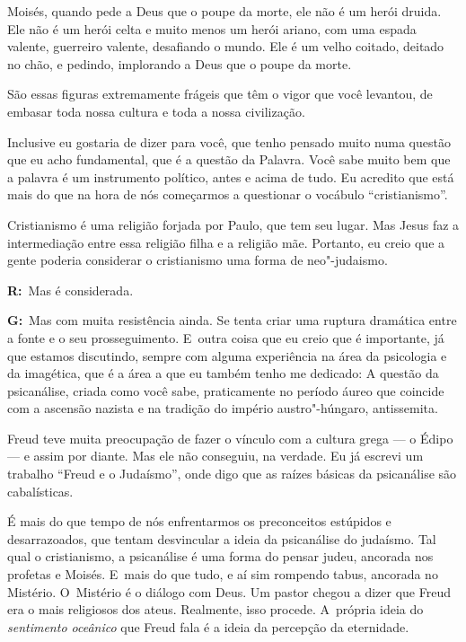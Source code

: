  

Moisés, quando pede a Deus que o poupe da morte, ele não é um herói
druida. Ele não é um herói celta e muito menos um herói ariano, com uma
espada valente, guerreiro valente, desafiando o mundo. Ele é um velho
coitado, deitado no chão, e pedindo, implorando a Deus que o poupe da
morte.

 

São essas figuras extremamente frágeis que têm o vigor que você
levantou, de embasar toda nossa cultura e toda a nossa civilização.

 

Inclusive eu gostaria de dizer para você, que tenho pensado muito numa
questão que eu acho fundamental, que é a questão da Palavra. Você sabe
muito bem que a palavra é um instrumento político, antes e acima de
tudo. Eu acredito que está mais do que na hora de nós começarmos a
questionar o vocábulo ``cristianismo''.

 

Cristianismo é uma religião forjada por Paulo, que tem seu lugar. Mas
Jesus faz a intermediação entre essa religião filha e a religião mãe.
Portanto, eu creio que a gente poderia considerar o cristianismo uma
forma de neo"-judaismo.

 

\textbf{R:}~Mas é considerada.

 

\textbf{G:}~Mas com muita resistência ainda. Se tenta criar uma ruptura
dramática entre a fonte e o seu prosseguimento. E~outra coisa que eu
creio que é importante, já que estamos discutindo, sempre com alguma
experiência na área da psicologia e da imagética, que é a área a que eu
também tenho me dedicado: A questão da psicanálise, criada como você
sabe, praticamente no período áureo que coincide com a ascensão nazista
e na tradição do império austro"-húngaro, antissemita.

 

Freud teve muita preocupação de fazer o vínculo com a cultura grega ---
o Édipo --- e assim por diante. Mas ele não conseguiu, na verdade. Eu já
escrevi um trabalho ``Freud e o Judaísmo'', onde digo que as raízes
básicas da psicanálise são cabalísticas.

 

É mais do que tempo de nós enfrentarmos os preconceitos estúpidos e
desarrazoados, que tentam desvincular a ideia da psicanálise do
judaísmo. Tal qual o cristianismo, a psicanálise é uma forma do pensar
judeu, ancorada nos profetas e Moisés. E~mais do que tudo, e aí sim
rompendo tabus, ancorada no Mistério. O~Mistério é o diálogo com Deus.
Um pastor chegou a dizer que Freud era o mais religiosos dos ateus.
Realmente, isso procede. A~própria ideia do \emph{sentimento oceânico}
que Freud fala é a ideia da percepção da eternidade.

